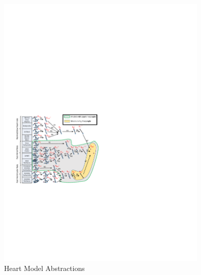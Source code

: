\begin{figure}[!t]
		\centering
		\includegraphics[width=0.9\textwidth]{figs/abs.pdf}
		\caption{\small Heart Model Abstractions}
		\label{fig:HM_abs}
\end{figure}

